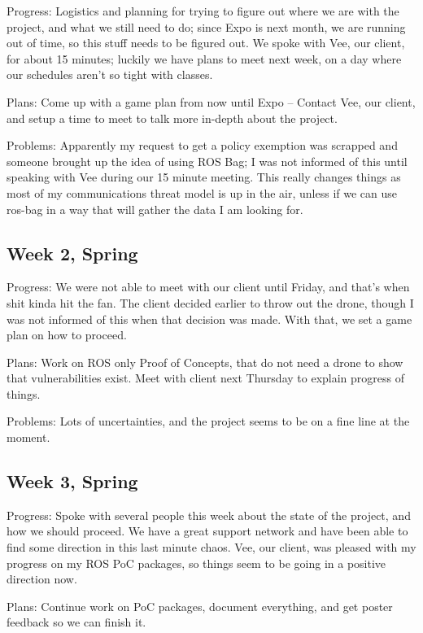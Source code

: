 \documentclass[IEEEtran,letterpaper,10pt,notitlepage,draftclsnofoot,onecolumn]{article}
\begin{document}
                            Progress: Logistics and planning for trying to figure out where we are with the project, and what we still need to do; since Expo is next month, we are running out of time, so this stuff needs to be figured out. We spoke with Vee, our client, for about 15 minutes; luckily we have plans to meet next week, on a day where our schedules aren't so tight with classes.

                            Plans: Come up with a game plan from now until Expo -- Contact Vee, our client, and setup a time to meet to talk more in-depth about the project.

                            Problems: Apparently my request to get a policy exemption was scrapped and someone brought up the idea of using ROS Bag; I was not informed of this until speaking with Vee during our 15 minute meeting. This really changes things as most of my communications threat model is up in the air, unless if we can use ros-bag in a way that will gather the data I am looking for.
                            \subsection{Week 2, Spring}
                            Progress: We were not able to meet with our client until Friday, and that's when shit kinda hit the fan. The client decided earlier to throw out the drone, though I was not informed of this when that decision was made. With that, we set a game plan on how to proceed.

                            Plans: Work on ROS only Proof of Concepts, that do not need a drone to show that vulnerabilities exist. Meet with client next Thursday to explain progress of things.

                            Problems: Lots of uncertainties, and the project seems to be on a fine line at the moment.
                            \subsection{Week 3, Spring}
                            Progress: Spoke with several people this week about the state of the project, and how we should proceed. We have a great support network and have been able to find some direction in this last minute chaos. Vee, our client, was pleased with my progress on my ROS PoC packages, so things seem to be going in a positive direction now.

                            Plans: Continue work on PoC packages, document everything, and get poster feedback so we can finish it.
\end{document}
